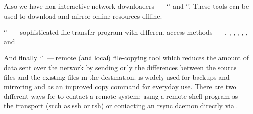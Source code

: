 Also we have non-interactive network downloaders~--- `' and `'.
These tools can be used to download and mirror online resources offline.

`'~--- sophisticated file transfer program with different access
methods~--- , , , ,
, ,  and .

And finally `'~--- remote (and local) file-copying tool which reduces
the amount  of  data  sent over the network by sending only the differences
between the source files and the existing files in the destination.
 is widely used for backups and  mirroring and as an improved
copy command for everyday use. There  are two different ways for 
to contact a remote system: using a remote-shell program as the transport
(such as ssh or rsh) or contacting an rsync daemon directly via .
